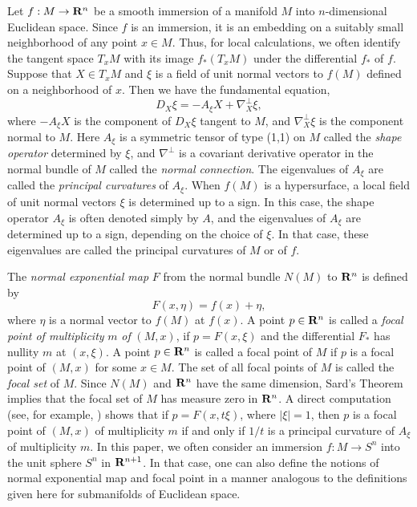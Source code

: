 \documentclass[12pt]{article}
\begin{document}
Let $f:M \rightarrow {\bf R}^n$ be a smooth immersion of a manifold $M$
into $n$-dimensional Euclidean space.  Since $f$ is an immersion,
it is an embedding on a suitably small neighborhood of any point
$x \in M$.  Thus, for local calculations, we often identify the
tangent space $T_xM$ with its image $f_*(T_xM)$ under the
differential $f_*$ of $f$.  Suppose that $X \in T_xM$ and $\xi$
is a field of unit normal vectors to $f(M)$ defined on a
neighborhood of $x$.  Then we have the fundamental equation,
\begin{equation}
\label{eq:fundamental-eq}
D_X\xi = -A_{\xi}X + \nabla_X^{\perp}\xi,
\end{equation}
where $-A_{\xi}X$ is the component of $D_X\xi$ tangent to $M$,
and $\nabla_X^{\perp}\xi$ is the component normal to $M$.
Here $A_{\xi}$ is a symmetric tensor of type (1,1) on $M$ called the
{\em shape operator} determined by $\xi$, and $\nabla^{\perp}$ is
a covariant derivative operator 
in the normal bundle of $M$ called the {\em normal connection}.
The eigenvalues of $A_{\xi}$ are called the {\em principal
curvatures} of $A_{\xi}$.  When $f(M)$ is a hypersurface, a local
field of unit normal vectors $\xi$ is determined up to a sign.
In this case, the shape operator $A_{\xi}$ is often denoted
simply by $A$, and the eigenvalues of $A_{\xi}$ are determined
up to a sign, depending on the choice of $\xi$.  In that case,
these eigenvalues are called the principal curvatures of
$M$ or of $f$.

The {\em normal exponential map} $F$ from the normal bundle
$N(M)$ to ${\bf R}^n$ is defined by
\begin{displaymath}
F(x,\eta) = f(x) + \eta,
\end{displaymath}
where $\eta$ is a normal vector to $f(M)$ at $f(x)$.  A point
$p \in {\bf R}^n$ is called a {\em focal point of multiplicity}
$m$ {\em of} $(M,x)$, if 
$p=F(x,\xi)$ and the differential $F_*$ has nullity $m$
at $(x,\xi)$.  A point $p \in {\bf R}^n$ is called a focal
point of $M$ if $p$ is a focal point of $(M,x)$ for some
$x \in M$.  The set of all focal points of $M$ is called the
{\em focal set} of $M$.  Since $N(M)$ and  ${\bf R}^n$ have the same
dimension, Sard's Theorem implies that the focal set of $M$
has measure zero in  ${\bf R}^n$.  A direct computation
(see, for example, \cite[p. 34]{Mil}) shows that if
$p = F(x,t\xi)$, where $|\xi |= 1$, then $p$
is a focal point of $(M,x)$ of multiplicity $m$ if and only if
$1/t$ is a principal curvature of $A_{\xi}$ of multiplicity $m$.
In this paper, we often consider an immersion
$f:M \rightarrow S^n$ into the unit sphere $S^n$ in ${\bf R}^{n+1}$.
In that case, one can also define the notions of normal
exponential map and focal point in a manner analogous to the
definitions given here for submanifolds of Euclidean space.
 
\end{document}
